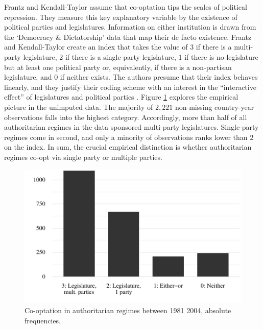 Frantz and Kendall-Taylor assume that co-optation tips the 
scales of political repression. They measure this key 
explanatory variable by the existence of political parties 
and legislatures. Information on either institution is drawn 
from the `Democracy \& Dictatorship' data 
\citep{Cheibub.2010} that map their de facto existence. 
Frantz and Kendall-Taylor create an index that takes the 
value of 3 if there is a multi-party legislature, 
2 if there is a single-party legislature, 1 if there is no 
legislature but at least one political party or, 
equivalently, if there is a non-partisan legislature, and 0 
if neither exists. The authors presume that their index 
behaves linearly, and they justify their coding scheme with 
an interest in the ``interactive effect'' of legislatures 
and political parties \citep[338]{Frantz.2014}. Figure 
\ref{fig:barCooptation} explores the empirical picture in 
the unimputed data. The majority of $2,221$ non-missing 
country-year observations falls into the highest 
category. Accordingly, more than half of all authoritarian
regimes in the data sponsored multi-party legislatures. 
Single-party regimes come in second, and only a minority of
observations ranks lower than $2$ on the index. In sum, 
the crucial empirical distinction is whether authoritarian 
regimes co-opt via single party or multiple parties.

\begin{figure}[!htb]
\centering
\includegraphics[width=\linewidth]{./sections/02data/barCooptation.pdf}
\caption{Co-optation in authoritarian regimes 
  between 1981 2004, absolute frequencies.
}
\label{fig:barCooptation}
\end{figure}

